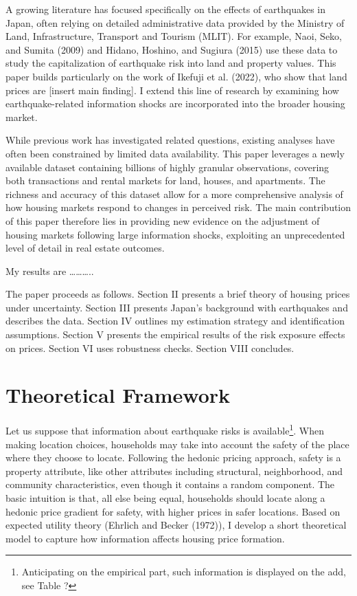 \documentclass[
  letterpaper,
  DIV=11,
  numbers=noendperiod]{scrartcl}
\begin{document}
A growing literature has focused specifically on the effects of
earthquakes in Japan, often relying on detailed administrative data
provided by the Ministry of Land, Infrastructure, Transport and Tourism
(MLIT). For example, Naoi, Seko, and Sumita (2009) and Hidano, Hoshino,
and Sugiura (2015) use these data to study the capitalization of
earthquake risk into land and property values. This paper builds
particularly on the work of Ikefuji et al. (2022), who show that land
prices are {[}insert main finding{]}. I extend this line of research by
examining how earthquake-related information shocks are incorporated
into the broader housing market.

While previous work has investigated related questions, existing
analyses have often been constrained by limited data availability. This
paper leverages a newly available dataset containing billions of highly
granular observations, covering both transactions and rental markets for
land, houses, and apartments. The richness and accuracy of this dataset
allow for a more comprehensive analysis of how housing markets respond
to changes in perceived risk. The main contribution of this paper
therefore lies in providing new evidence on the adjustment of housing
markets following large information shocks, exploiting an unprecedented
level of detail in real estate outcomes.

My results are \ldots\ldots\ldots..

The paper proceeds as follows. Section II presents a brief theory of
housing prices under uncertainty. Section III presents Japan's
background with earthquakes and describes the data. Section IV outlines
my estimation strategy and identification assumptions. Section V
presents the empirical results of the risk exposure effects on prices.
Section VI uses robustness checks. Section VIII concludes.

\section{Theoretical Framework}

Let us suppose that information about earthquake risks is
available\footnote{Anticipating on the empirical part, such information is displayed on the add, see Table ?}.
When making location choices, households may take into account the
safety of the place where they choose to locate. Following the hedonic
pricing approach, safety is a property attribute, like other attributes
including structural, neighborhood, and community characteristics, even
though it contains a random component. The basic intuition is that, all
else being equal, households should locate along a hedonic price
gradient for safety, with higher prices in safer locations. Based on
expected utility theory (Ehrlich and Becker (1972)), I develop a short
theoretical model to capture how information affects housing price
formation.
\end{document}
